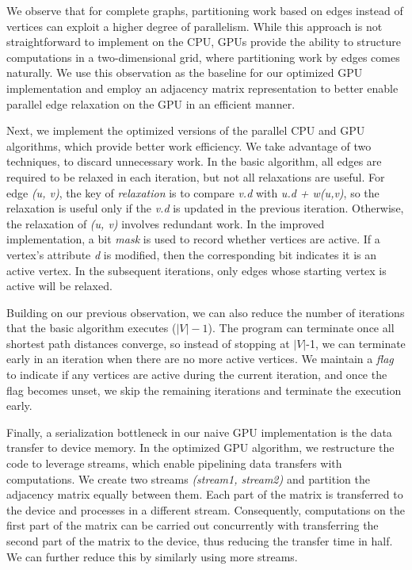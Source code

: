 \documentclass[11pt,a4paper, final, twoside]{article}
\theoremstyle{proposition}
\theoremstyle{definition}
\theoremstyle{remark}
\numberwithin{equation}{section}
\begin{document}
We observe that for complete graphs, partitioning work based on edges instead of vertices can exploit a higher degree of parallelism. While this approach is not straightforward to implement on the CPU, GPUs provide the ability to structure computations in a two-dimensional grid, where partitioning work by edges comes naturally. We use this observation as the baseline for our optimized GPU implementation and employ an adjacency matrix representation to better enable parallel edge relaxation on the GPU in an efficient manner.

Next, we implement the optimized versions of the parallel CPU and GPU algorithms, which provide better work efficiency. We take advantage of two techniques, to discard unnecessary work. In the basic algorithm, all edges are required to be relaxed in each iteration, but not all relaxations are useful. For edge \emph{(u, v)}, the key of \emph{relaxation} is to compare \emph{v.d} with \emph{u.d + w(u,v)}, so the relaxation is useful only if the \emph{v.d} is updated in the previous iteration. Otherwise, the relaxation of \emph{(u, v)} involves redundant work. In the improved implementation, a bit \emph{mask} is used to record whether vertices are active. If a vertex's attribute \emph{d} is modified, then the corresponding bit indicates it is an active vertex. In the subsequent iterations, only edges whose starting vertex is active will be relaxed. 

Building on our previous observation, we can also reduce the number of iterations that the basic algorithm executes ($|V|-1$). The program can terminate once all shortest path distances converge, so instead of stopping at $|V|$-1, we can terminate early in an iteration when there are no more active vertices. We maintain a \emph{flag} to indicate if any vertices are active during the current iteration, and once the flag becomes unset, we skip the remaining iterations and terminate the execution early.


Finally, a serialization bottleneck in our naive GPU implementation is the data transfer to device memory. In the optimized GPU algorithm, we restructure the code to leverage streams, which enable pipelining data transfers with computations.
We create two streams \emph{(stream1, stream2)} and partition the adjacency matrix equally between them. Each part of the matrix is transferred to the device and processes in a different stream. Consequently, computations on the first part of the matrix can be carried out concurrently with transferring the second part of the matrix to the device, thus reducing the transfer time in half. We can further reduce this by similarly using more streams.
\newpage
\end{document}
